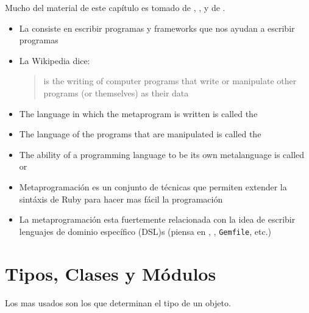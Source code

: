Mucho del material de este capítulo es tomado de 
\cite{PRP},
\cite{RPL},
\cite{metaprogramming}
y de
\cite{ER}.

\begin{itemize}
\item
La  consiste en escribir programas y frameworks que nos ayudan a escribir programas
\item
La Wikipedia dice:

\begin{quote}
 is the writing of computer programs that write or manipulate other programs (or themselves) as their data
\end{quote}
\item
The language in which the metaprogram is written is called the  
\item
The language of the programs that are manipulated is called the  
\item
The ability of a programming language to
be its own metalanguage is called  or 
\item
Metaprogramación es un conjunto de técnicas que permiten extender la sintáxis de Ruby para hacer mas fácil la programación
\item
La metaprogramación esta fuertemente relacionada con la idea de escribir lenguajes de dominio específico (DSL)s (piensa en \rake{}, \rspec{}, \verb|Gemfile|, etc.)
\end{itemize}

\section{Tipos, Clases y Módulos}

Los  mas usados son los que determinan el tipo de un objeto.

